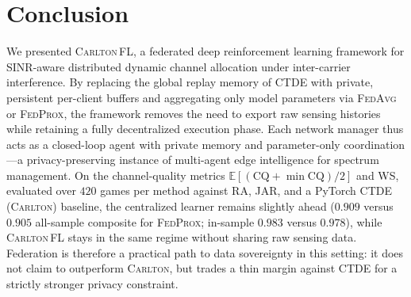 \documentclass[journal]{IEEEtran}
\newcommand{\CARLTON}{\textsc{Carlton}}
\newcommand{\OURS}{\textsc{Carlton\,FL}}
\newcommand{\FedAvg}{\textsc{FedAvg}}
\newcommand{\FedProx}{\textsc{FedProx}}
\begin{document}
\section{Conclusion}
\label{sec:conclusion}

We presented \OURS{}, a federated deep reinforcement learning framework for
SINR-aware distributed dynamic channel allocation under inter-carrier
interference. By replacing the global replay memory of CTDE with private,
persistent per-client buffers and aggregating only model parameters via
\FedAvg{} or \FedProx{}, the framework removes the need to export raw sensing
histories while retaining a fully decentralized execution phase. Each network
manager thus acts as a closed-loop agent with private memory and
parameter-only coordination---a privacy-preserving instance of multi-agent
edge intelligence for spectrum management. On the channel-quality metrics
$\mathbb{E}[(\mathrm{CQ}+\min\mathrm{CQ})/2]$ and WS, evaluated over $420$
games per method against RA, JAR, and a PyTorch CTDE (\CARLTON{}) baseline,
the centralized learner remains slightly ahead ($0.909$ versus $0.905$
all-sample composite for \FedProx{}; in-sample $0.983$ versus $0.978$), while
\OURS{} stays in the same regime without sharing raw sensing data. Federation
is therefore a practical path to data sovereignty in this setting: it does not
claim to outperform \CARLTON{}, but trades a thin margin against CTDE for a
strictly stronger privacy constraint.
\end{document}

